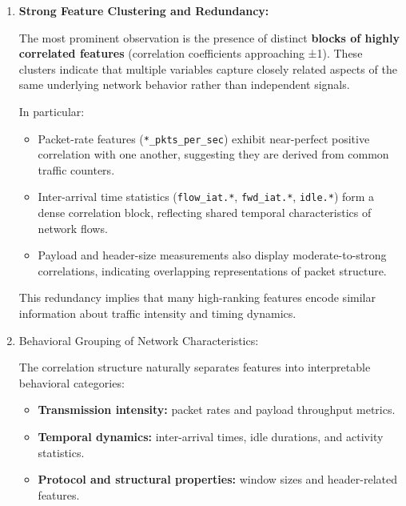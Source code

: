 \documentclass[
  letterpaper,
  DIV=11,
  numbers=noendperiod]{scrartcl}
\providecommand{\tightlist}{%
  \setlength{\itemsep}{0pt}\setlength{\parskip}{0pt}}
\begin{document}
\begin{enumerate}
\def\labelenumi{\arabic{enumi}.}
\item
  \textbf{Strong Feature Clustering and Redundancy:}

  The most prominent observation is the presence of distinct
  \textbf{blocks of highly correlated features} (correlation
  coefficients approaching ±1). These clusters indicate that multiple
  variables capture closely related aspects of the same underlying
  network behavior rather than independent signals.

  In particular:

  \begin{itemize}
  \tightlist
  \item
    Packet-rate features (\texttt{*\_pkts\_per\_sec}) exhibit
    near-perfect positive correlation with one another, suggesting they
    are derived from common traffic counters.
  \item
    Inter-arrival time statistics (\texttt{flow\_iat.*},
    \texttt{fwd\_iat.*}, \texttt{idle.*}) form a dense correlation
    block, reflecting shared temporal characteristics of network flows.
  \item
    Payload and header-size measurements also display moderate-to-strong
    correlations, indicating overlapping representations of packet
    structure.
  \end{itemize}

  This redundancy implies that many high-ranking features encode similar
  information about traffic intensity and timing dynamics.
\item
  Behavioral Grouping of Network Characteristics:

  The correlation structure naturally separates features into
  interpretable behavioral categories:

  \begin{itemize}
  \tightlist
  \item
    \textbf{Transmission intensity:} packet rates and payload throughput
    metrics.
  \item
    \textbf{Temporal dynamics:} inter-arrival times, idle durations, and
    activity statistics.
  \item
    \textbf{Protocol and structural properties:} window sizes and
    header-related features.
  \end{itemize}


\end{enumerate}
\end{document}
